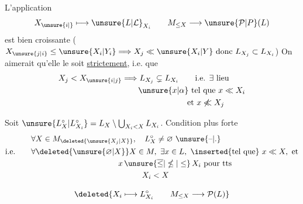  

 L'application
\[
 X_{\unsure{i|{}}}\longmapsto\unsure{L|\mathcal{L}}_{X_i}\qquad
 M_{\leq X}\longrightarrow\unsure{\mathcal P|P}(L)
\]
est bien  croissante ($X_{\unsure{j|i}}\leq \unsure{X_i|Y_i}\Longrightarrow X_j\ll \unsure{X_i|Y}\text{ donc }L_{X_j}\subset L_{X_i}$) On aimerait qu'elle le soit \uline{strictement}, i.e. que 
\[
\begin{aligned}
 X_j<X_{\unsure{i|j}}&\Longrightarrow L_{X_j}\subsetneq L_{X_i}\qquad\text{i.e. }\exists\ \text{lieu}\\
 &\qquad \unsure{x|\alpha}\ \text{tel que }x\ll X_i\\
 &\hspace{8em}\text{et }x\not\ll X_j
\end{aligned}
\]

 Soit $\unsure{L_X^{\circ}|L_{X_i}^{\circ}}=L_X\setminus\bigcup_{X_i<X}L_{X_i}$. Condition plus forte
\[
\begin{aligned}
 &\forall X\in M_{\deleted{\unsure{X_j|X}}},\quad L_X^{\circ}\ne\varnothing\ \unsure{\text{--}|.}\\
 \text{i.e.}\qquad &\forall\deleted{\unsure{\varnothing|X}}X\in M,\ \exists x\in L,\ \inserted{\text{tel que}}\ x\ll X,\ \text{et}\\
 &\hspace{11em}x\,\unsure{\overline{\leq}|\nleq|\leq}\,X_i\ \text{pour tts}\\
 &\hspace{14em}X_i<X
\end{aligned}
\]

\[
 \deleted{X_i\longmapsto L_{X_i}^{\circ}\qquad M_{\leq X}\longrightarrow\mathcal P(L)}
\]


